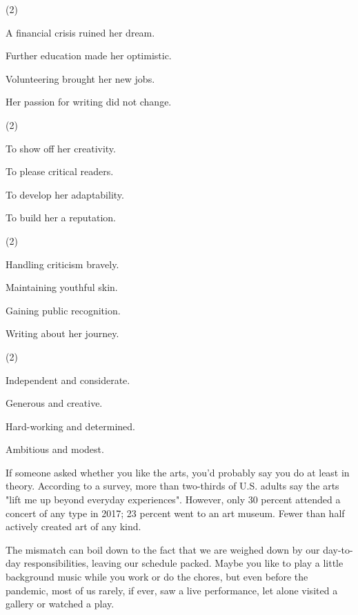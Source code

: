 \documentclass{英语试卷}
\begin{document}
\begin{choices}(2)
  \item A financial crisis ruined her dream.
  \item Further education made her optimistic.
  \item Volunteering brought her new jobs.
  \item Her passion for writing did not change.
\end{choices}
\begin{choices}(2)
  \item To show off her creativity.
  \item To please critical readers.
  \item To develop her adaptability.
  \item To build her a reputation.
\end{choices}
\begin{choices}(2)
  \item Handling criticism bravely.
  \item Maintaining youthful skin.
  \item Gaining public recognition.
  \item Writing about her journey.
\end{choices}
\begin{choices}(2)
  \item Independent and considerate.
  \item Generous and creative.
  \item Hard-working and determined.
  \item Ambitious and modest.
\end{choices}
\par If someone asked whether you like the arts, you'd probably say you do at least in theory. According to a survey, more than two-thirds of U.S. adults say the arts "lift me up beyond everyday experiences". However, only 30 percent attended a concert of any type in 2017; 23 percent went to an art museum. Fewer than half actively created art of any kind.\par
\par The mismatch can boil down to the fact that we are weighed down by our day-to-day responsibilities, leaving our schedule packed. Maybe you like to play a little background music while you work or do the chores, but even before the pandemic, most of us rarely, if ever, saw a live performance, let alone visited a gallery or watched a play.\par
\end{document}
